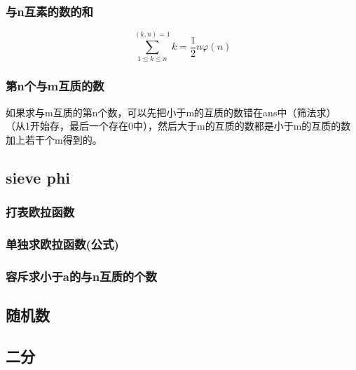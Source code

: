 \documentclass[a4paper]{article}
\begin{document}
\begin{CJK*}{UTF8}{gbsn}
\begin{multicols}{3}
\begin{flushleft}



\subsubsection{与n互素的数的和}
$$\sum_{1 \le k \le n}^{(k,n)=1} k = \frac{1}{2} n \varphi(n)$$


\subsubsection{第n个与m互质的数}
如果求与m互质的第n个数，可以先把小于m的互质的数错在ans中（筛法求）
（从1开始存，最后一个存在0中），然后大于m的互质的数都是小于m的互质的数加上若干个m得到的。



\subsection{sieve phi}


\subsubsection{打表欧拉函数}



\subsubsection{单独求欧拉函数(公式)}


\subsubsection{容斥求小于a的与n互质的个数}


\subsection{随机数}


\subsection{二分}


\end{flushleft}
\end{multicols}
\end{CJK*}
\end{document}
